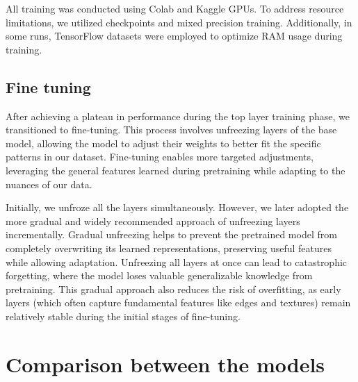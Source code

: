 \documentclass[11pt]{article}
\begin{document}
All training was conducted using Colab and Kaggle GPUs. To address resource limitations, we utilized checkpoints and mixed precision training. Additionally, in some runs, TensorFlow datasets were employed to optimize RAM usage during training.
\subsection{Fine tuning}
After achieving a plateau in performance during the top layer training phase, we transitioned to fine-tuning. This process involves unfreezing layers of the base model, allowing the model to adjust their weights to better fit the specific patterns in our dataset. Fine-tuning enables more targeted adjustments, leveraging the general features learned during pretraining while adapting to the nuances of our data.

Initially, we unfroze all the layers simultaneously. However, we later adopted the more gradual and widely recommended approach of unfreezing layers incrementally. Gradual unfreezing helps to prevent the pretrained model from completely overwriting its learned representations, preserving useful features while allowing adaptation. Unfreezing all layers at once can lead to catastrophic forgetting, where the model loses valuable generalizable knowledge from pretraining. This gradual approach also reduces the risk of overfitting, as early layers (which often capture fundamental features like edges and textures) remain relatively stable during the initial stages of fine-tuning.
\section{Comparison between the models}
\end{document}
